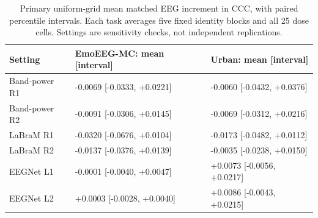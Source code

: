 \begin{table}[t]
\centering\small
\caption{Primary uniform-grid mean matched EEG increment in CCC, with paired percentile intervals. Each task averages five fixed identity blocks and all 25 dose cells. Settings are sensitivity checks, not independent replications.}
\label{tab:primary-v9}
\begin{tabular}{@{}lll@{}}
\toprule
Setting & EmoEEG-MC: mean [interval] & Urban: mean [interval] \\
\midrule
Band-power R1 & -0.0069 [-0.0333, +0.0221] & -0.0060 [-0.0432, +0.0376] \\
Band-power R2 & -0.0091 [-0.0306, +0.0145] & -0.0069 [-0.0312, +0.0216] \\
LaBraM R1 & -0.0320 [-0.0676, +0.0104] & -0.0173 [-0.0482, +0.0112] \\
LaBraM R2 & -0.0137 [-0.0376, +0.0139] & -0.0035 [-0.0238, +0.0150] \\
EEGNet L1 & -0.0001 [-0.0040, +0.0047] & +0.0073 [-0.0056, +0.0217] \\
EEGNet L2 & +0.0003 [-0.0028, +0.0040] & +0.0086 [-0.0043, +0.0215] \\
\bottomrule
\end{tabular}
\end{table}
